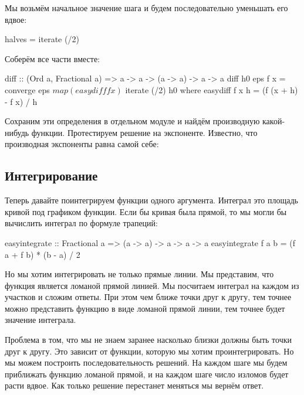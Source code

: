 Мы возьмём начальное значение шага и будем последовательно
уменьшать его вдвое:

\begin{code}
halves = iterate (/2) 
\end{code}

Соберём все части вместе:

\begin{code}
diff :: (Ord a, Fractional a) => a -> a -> (a -> a) -> a -> a
diff h0 eps f x = converge eps $ map (easydiff f x) $ iterate (/2) h0
    where easydiff f x h = (f (x + h) - f x) / h
\end{code}

Сохраним эти определения в отдельном модуле и найдём производную 
какой-нибудь функции. Протестируем решение на экспоненте.
Известно, что производная экспоненты равна самой себе:


\subsection{Интегрирование}

Теперь давайте поинтегрируем функции одного аргумента. 
Интеграл это площадь кривой под графиком функции. 
Если бы кривая была прямой, то мы могли бы вычислить 
интеграл по формуле трапеций:

\begin{code}
easyintegrate :: Fractional a => (a -> a) -> a -> a -> a
easyintegrate f a b = (f a + f b) * (b - a) / 2
\end{code}

Но мы хотим интегрировать не только прямые линии. 
Мы представим, что функция является ломаной прямой
линией. Мы посчитаем интеграл на каждом из участков и 
сложим ответы. При этом чем ближе точки друг к другу, 
тем точнее можно представить функцию в виде ломаной 
прямой линии, тем точнее будет значение интеграла.

Проблема в том, что мы не знаем заранее насколько
близки должны быть точки друг к другу. Это
зависит от функции, которую мы хотим проинтегрировать. 
Но мы можем построить последовательность решений. 
На каждом шаге мы будем приближать функцию 
ломаной прямой, и на каждом шаге число изломов
будет расти вдвое. Как только решение перестанет меняться 
мы вернём ответ.

